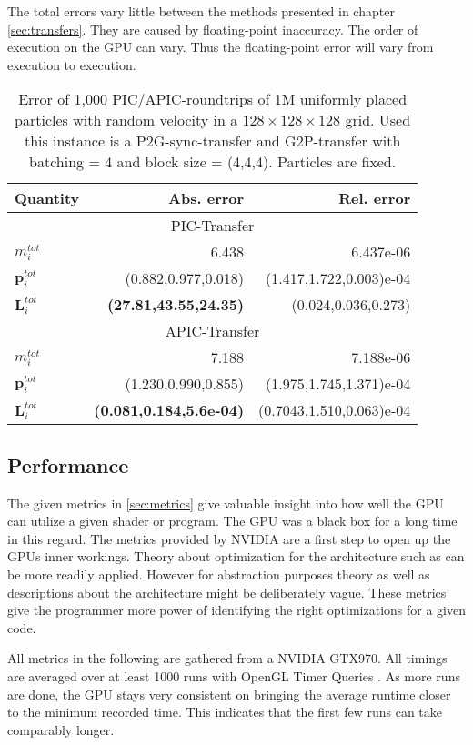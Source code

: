 \documentclass[m,times]{cgMA}
\begin{document}
The total errors vary little between the methods presented in chapter \ref{sec:transfers}. They are caused by floating-point inaccuracy. The order of execution on the GPU can vary. Thus the floating-point error will vary from execution to execution.
\begin{table}[t]
\centering
  \begin{tabular}{|l|r|r|}\hline
    Quantity& Abs. error  & Rel. error \\ \hline
    \multicolumn{3}{|c|}{PIC-Transfer}\\\hline
    $m^{tot}_i$ & 6.438     & 6.437e-06     \\\hline
    $\boldsymbol{p}^{tot}_i$  & (0.882,0.977,0.018)&(1.417,1.722,0.003)e-04 \\\hline
    $\boldsymbol{L}^{tot}_i$  & \textbf{(27.81,43.55,24.35)}&(0.024,0.036,0.273)\\\hline
    \multicolumn{3}{|c|}{APIC-Transfer}\\\hline
    $m^{tot}_i$ & 7.188     & 7.188e-06     \\\hline
    $\boldsymbol{p}^{tot}_i$  & (1.230,0.990,0.855)&(1.975,1.745,1.371)e-04 \\\hline
    $\boldsymbol{L}^{tot}_i$  & \textbf{(0.081,0.184,5.6e-04)}&(0.7043,1.510,0.063)e-04\\\hline
   \end{tabular}
   \caption{Error of 1,000 PIC/APIC-roundtrips of 1M uniformly placed particles with random velocity in a $128\times128\times128$ grid. Used this instance is a P2G-sync-transfer and G2P-transfer with batching = 4 and block size = (4,4,4). Particles are fixed.}
  \label{tab:roundtrip}
\end{table}
\clearpage
\subsection{Performance}\label{sec:perf}
The given metrics in \ref{sec:metrics} give valuable insight into how well the GPU can utilize a given shader or program. The GPU was a black box for a long time in this regard. The metrics provided by NVIDIA are a first step to open up the GPUs inner workings. Theory about optimization for the architecture such as \cite{NVIDIA:BEST:PRACTICE} can be more readily applied. However for abstraction purposes theory as well as descriptions about the architecture might be deliberately vague. These metrics give the programmer more power of identifying the right optimizations for a given code.

All metrics in the following are gathered from a NVIDIA GTX970. All timings are averaged over at least 1000 runs with OpenGL Timer Queries \cite{KHRONOS:TIMER_QUERY}. As more runs are done, the GPU stays very consistent on bringing the average runtime closer to the minimum recorded time. This indicates that the first few runs can take comparably longer.
\end{document}
